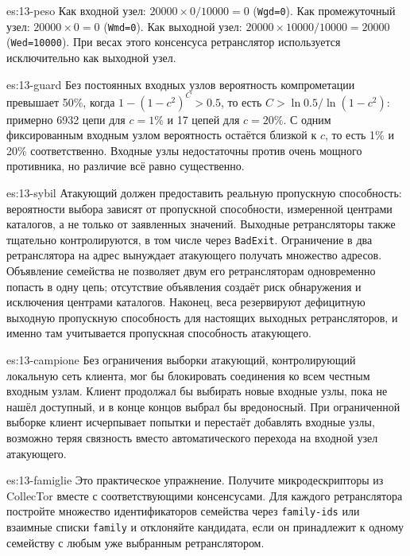 \begin{soluzione}{es:13-peso}
Как входной узел: $20000 \times 0/10000 = 0$ (\texttt{Wgd=0}). Как промежуточный узел: $20000 \times 0 = 0$ (\texttt{Wmd=0}). Как выходной узел: $20000 \times 10000/10000 = 20000$ (\texttt{Wed=10000}). При весах этого консенсуса ретранслятор используется исключительно как выходной узел.
\end{soluzione}

\begin{soluzione}{es:13-guard}
Без постоянных входных узлов вероятность компрометации превышает 50\%, когда $1 - (1 - c^2)^C > 0.5$, то есть $C > \ln 0.5 / \ln(1 - c^2)$: примерно \num{6932} цепи для $c = 1\%$ и 17 цепей для $c = 20\%$. С одним фиксированным входным узлом вероятность остаётся близкой к $c$, то есть 1\% и 20\% соответственно. Входные узлы недостаточны против очень мощного противника, но различие всё равно существенно.
\end{soluzione}

\begin{soluzione}{es:13-sybil}
Атакующий должен предоставить реальную пропускную способность: вероятности выбора зависят от пропускной способности, измеренной центрами каталогов, а не только от заявленных значений. Выходные ретрансляторы также тщательно контролируются, в том числе через \texttt{BadExit}. Ограничение в два ретранслятора на адрес вынуждает атакующего получать множество адресов. Объявление семейства не позволяет двум его ретрансляторам одновременно попасть в одну цепь; отсутствие объявления создаёт риск обнаружения и исключения центрами каталогов. Наконец, веса резервируют дефицитную выходную пропускную способность для настоящих выходных ретрансляторов, и именно там учитывается пропускная способность атакующего.
\end{soluzione}

\begin{soluzione}{es:13-campione}
Без ограничения выборки атакующий, контролирующий локальную сеть клиента, мог бы блокировать соединения ко всем честным входным узлам. Клиент продолжал бы выбирать новые входные узлы, пока не нашёл доступный, и в конце концов выбрал бы вредоносный. При ограниченной выборке клиент исчерпывает попытки и перестаёт добавлять входные узлы, возможно теряя связность вместо автоматического перехода на входной узел атакующего.
\end{soluzione}

\begin{soluzione}{es:13-famiglie}
Это практическое упражнение. Получите микродескрипторы из CollecTor вместе с соответствующими консенсусами. Для каждого ретранслятора постройте множество идентификаторов семейства через \texttt{family-ids} или взаимные списки \texttt{family} и отклоняйте кандидата, если он принадлежит к одному семейству с любым уже выбранным ретранслятором.
\end{soluzione}

